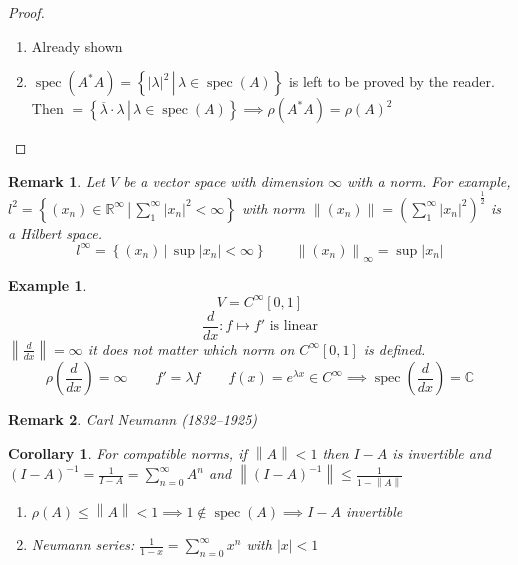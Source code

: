 \documentclass{article}
\newtheorem{example}{Example}  \numberwithin{example}{section}
\newtheorem{remark}{Remark}  \numberwithin{remark}{section}
\newtheorem{corollary}{Corollary}  \numberwithin{corollary}{section}
\newcommand{\setdef}[2]{\left\{\left.#1\,\right|\,#2\right\}}
\newcommand{\norm}[1]{\left\|#1\right\|}
\newcommand{\card}[1]{\left|#1\right|}
\begin{document}
\begin{proof}
  \begin{enumerate}
    \item Already shown
    \item $\operatorname{spec}(A^* A) = \setdef{\card{\lambda}^2}{\lambda \in \operatorname{spec}(A)}$ is left to be proved by the reader. Then $= \setdef{\overline\lambda \cdot \lambda}{\lambda \in \operatorname{spec}(A)} \implies \rho(A^* A) = \rho(A)^2$
  \end{enumerate}
\end{proof}

\begin{remark} %
  Let $V$ be a vector space with dimension $\infty$ with a norm.
  For example, $l^2 = \setdef{(x_n) \in \mathbb R^\infty}{\sum_1^\infty \card{x_n}^2 < \infty}$
  with norm $\norm{(x_n)} = \left(\sum_1^\infty \card{x_n}^2\right)^{\frac12}$ is a \emph{Hilbert space}.
  \[ l^\infty = \setdef{(x_n)}{\sup\card{x_n} < \infty} \qquad \norm{(x_n)}_{\infty} = \sup\card{x_n} \]
\end{remark}

\begin{example}
  \[ V = C^{\infty}[0,1] \]
  \[ \frac d{dx}: f \mapsto f' \text{ is linear} \]
  $\norm{\frac{d}{dx}} = \infty$ it does not matter which norm on $C^{\infty}[0,1]$ is defined.
  \[ \rho(\frac d{dx}) = \infty \qquad f' = \lambda f \qquad f(x) = e^{\lambda x} \in C^\infty \implies \operatorname{spec}(\frac{d}{dx}) = \mathbb C \]
\end{example}

\begin{remark}
  Carl Neumann (1832--1925)
\end{remark}

\begin{corollary} %
  \label{cor1410}
  For compatible norms, if $\norm{A} < 1$ then $I - A$ is invertible and $(I - A)^{-1} = \frac{1}{I - A} = \sum_{n=0}^\infty A^n$ and $\norm{(I - A)^{-1}} \leq \frac{1}{1 - \norm{A}}$

  \begin{enumerate}
    \item $\rho(A) \leq \norm{A} < 1 \implies 1 \not\in \operatorname{spec}(A) \implies I - A$ invertible
    \item Neumann series: $\frac{1}{1 - x} = \sum_{n=0}^\infty x^n$ with $\card{x} < 1$
  \end{enumerate}
\end{corollary}
\end{document}
